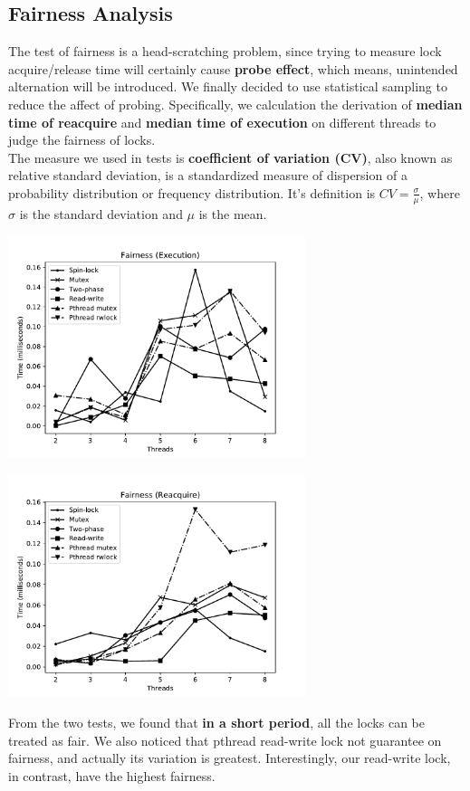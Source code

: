 \documentclass{article}
\begin{document}
\subsection{Fairness Analysis}
The test of fairness is a head-scratching problem, since trying to measure lock acquire/release time will certainly cause \textbf{probe effect}, which means, unintended alternation will be introduced. We finally decided to use statistical sampling to reduce the affect of probing. Specifically, we calculation the derivation of \textbf{median time of reacquire} and \textbf{median time of execution} on different threads to judge the fairness of locks.\\
The measure we used in tests is \textbf{coefficient of variation (CV)}, also known as relative standard deviation, is a standardized measure of dispersion of a probability distribution or frequency distribution. It's definition is $CV=\frac{\sigma}{\mu}$, where $\sigma$ is the standard deviation and $\mu$ is the mean.
\begin{center}
\includegraphics[width=0.65\textwidth]{OSLAB4_FAIR1.pdf}
\end{center}
\begin{center}
\includegraphics[width=0.65\textwidth]{OSLAB4_FAIR2.pdf}
\end{center}
From the two tests, we found that \textbf{in a short period}, all the locks can be treated as fair. We also noticed that pthread read-write lock not guarantee on fairness, and actually its variation is greatest. Interestingly, our read-write lock, in contrast, have the highest fairness.
\end{document}
